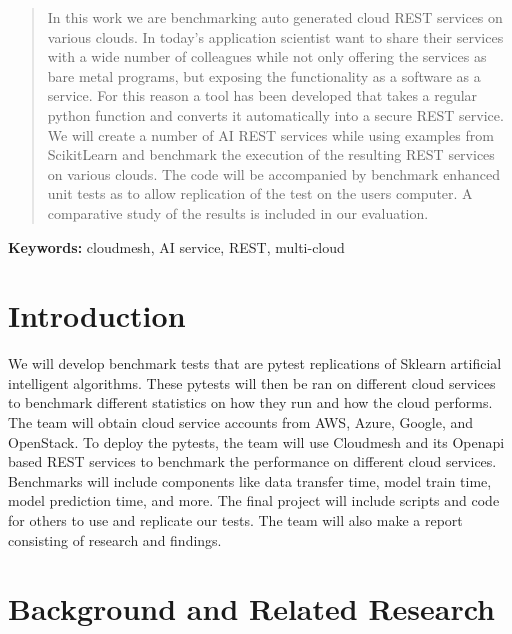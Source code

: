 
\tableofcontents

\begin{abstract}

In this work we are benchmarking auto generated cloud REST services on
various clouds. In today's application scientist want to share their
services with a wide number of colleagues while not only offering the
services as bare metal programs, but exposing the functionality as a
software as a service. For this reason a tool has been developed that
takes a regular python function and converts it automatically into a
secure REST service. We will create a number of AI REST services while
using examples from ScikitLearn and benchmark the execution of the
resulting REST services on various clouds. The code will be accompanied
by benchmark enhanced unit tests as to allow replication of the test on
the users computer. A comparative study of the results is included in
our evaluation.

\end{abstract}

\maketitle

\textbf{Keywords:} cloudmesh, AI service, REST, multi-cloud

\section{Introduction}\label{introduction}

We will develop benchmark tests that are pytest replications of Sklearn
artificial intelligent algorithms. These pytests will then be ran on
different cloud services to benchmark different statistics on how they
run and how the cloud performs. The team will obtain cloud service
accounts from AWS, Azure, Google, and OpenStack. To deploy the pytests,
the team will use Cloudmesh and its Openapi based REST services to
benchmark the performance on different cloud services. Benchmarks will
include components like data transfer time, model train time, model
prediction time, and more. The final project will include scripts and
code for others to use and replicate our tests. The team will also make
a report consisting of research and findings.

\section{Background and Related
Research}\label{background-and-related-research}

